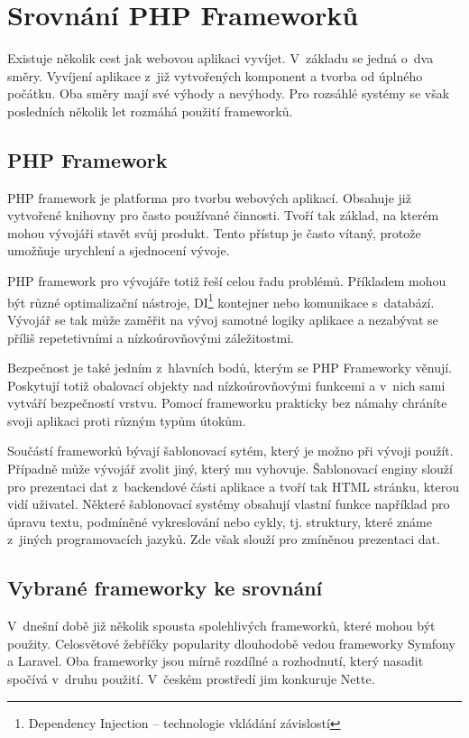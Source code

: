 \documentclass[czech,BP]{thesiskiv}
\begin{document}
\section{Srovnání PHP Frameworků}
	\par Existuje několik cest jak webovou aplikaci vyvíjet. V~základu se jedná o~dva směry. Vyvíjení aplikace z~již vytvořených komponent a tvorba od úplného počátku. Oba směry mají své výhody a nevýhody. Pro rozsáhlé systémy se však posledních několik let rozmáhá použití frameworků.
	\subsection{PHP Framework}
	\par PHP framework je platforma pro tvorbu webových aplikací. Obsahuje již vytvořené knihovny pro často používané činnosti. Tvoří tak základ, na kterém mohou vývojáři stavět svůj produkt. Tento přístup je často vítaný, protože umožňuje urychlení a sjednocení vývoje.
	\par PHP framework pro vývojáře totiž řeší celou řadu problémů. Příkladem mohou být různé optimalizační nástroje, DI\footnote{Dependency Injection -- technologie vkládání závislostí} kontejner nebo komunikace s~databází. Vývojář se tak může zaměřit na vývoj samotné logiky aplikace a nezabývat se příliš repetetivními a nízkoúrovňovými záležitostmi.
	\par Bezpečnost je také jedním z~hlavních bodů, kterým se PHP Frameworky věnují. Poskytují totiž obalovací objekty nad nízkoúrovňovými funkcemi a v~nich sami vytváří bezpečností vrstvu. Pomocí frameworku prakticky bez námahy chráníte svoji aplikaci proti různým typům útokům. 
	\par Součástí frameworků bývají šablonovací sytém, který je možno při vývoji použít. Případně může vývojář zvolit jiný, který mu vyhovuje. Šablonovací enginy slouží pro prezentaci dat z~backendové části aplikace a tvoří tak HTML stránku, kterou vidí uživatel. Některé šablonovací systémy obsahují vlastní funkce například pro úpravu textu, podmíněné vykreslování nebo cykly, tj. struktury, které známe z~jiných programovacích jazyků. Zde však slouží pro zmíněnou prezentaci dat.
	\subsection{Vybrané frameworky ke srovnání}
	\par V~dnešní době již několik spousta spolehlivých frameworků, které mohou být použity. Celosvětové žebříčky popularity dlouhodobě vedou frameworky Symfony a Laravel. Oba frameworky jsou mírně rozdílné a rozhodnutí, který nasadit spočívá v~druhu použití. V~českém prostředí jim konkuruje Nette.
\end{document}
